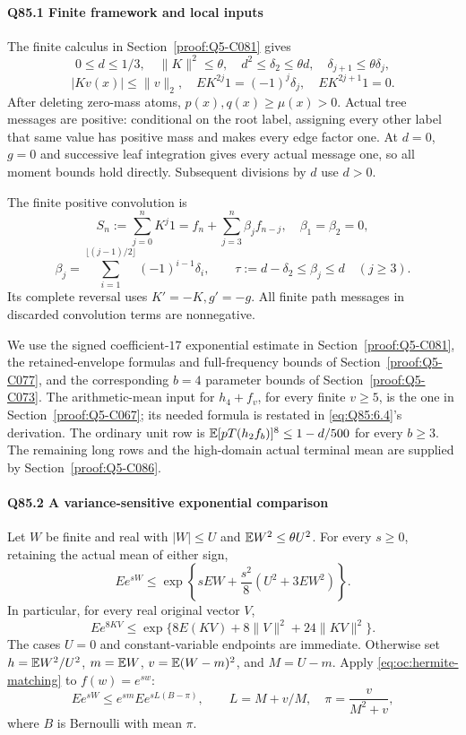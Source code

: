 \paragraph{Q85.1 Finite framework and local inputs}
The finite calculus in Section~\ref{proof:Q5-C081} gives
\[
 0\le d\le1/3,\quad\|K\|^2\le\theta,\quad
 d^2\le \delta_2\le\theta d,\quad \delta_{j+1}\le\theta \delta_j,
\]
\[
 |Kv(x)|\le\|v\|_2,\quad
 EK^{2j}1=(-1)^j \delta_j,\quad EK^{2j+1}1=0.               \tag{Q85.1.1}\label{eq:Q85:1.1}
\]
After deleting zero-mass atoms, \(p(x),\allowbreak q(x)\ge\allowbreak \mu(x)>\allowbreak 0\).
Actual tree messages are positive: conditional on the root label, assigning every other label that same value has positive mass and makes every edge factor one.
At \(d=\allowbreak 0\), \(g=\allowbreak 0\) and successive leaf integration gives every actual message one, so all moment bounds hold directly.
Subsequent divisions by \(d\) use \(d>\allowbreak 0\).

The finite positive convolution is
\[
 S_n:=\sum_{j=0}^nK^j1
 =f_n+\sum_{j=3}^n\beta_jf_{n-j},\quad
 \beta_1=\beta_2=0,
\]
\[
 \beta_j=\sum_{i=1}^{\lfloor(j-1)/2\rfloor}(-1)^{i-1}\delta_i,
 \qquad \tau:=d-\delta_2\le\beta_j\le d\quad(j\ge3).        \tag{Q85.1.2}\label{eq:Q85:1.2}
\]
Its complete reversal uses \(K'=\allowbreak -K,\allowbreak g'=\allowbreak -g\).
All finite path messages in discarded convolution terms are nonnegative.

We use the signed coefficient-\(17\) exponential estimate in Section~\ref{proof:Q5-C081}, the retained-envelope formulas and full-frequency bounds of Section~\ref{proof:Q5-C077}, and the corresponding \(b=\allowbreak 4\) parameter bounds of Section~\ref{proof:Q5-C073}.
The arithmetic-mean input for \(h_4+f_v\), for every finite \(v\ge\allowbreak 5\), is the one in Section~\ref{proof:Q5-C067}; its needed formula is restated in \eqref{eq:Q85:6.4}'s derivation.
The ordinary unit row is \( \mathbb E[pT(h_2f_b)]^8\le\allowbreak 1-d/500\) for every \(b\ge\allowbreak 3\).
The remaining long rows and the high-domain actual terminal mean are supplied by Section~\ref{proof:Q5-C086}.

\paragraph{Q85.2 A variance-sensitive exponential comparison}\label{calc:Q85:variance-exp}
Let \(W\) be finite and real with \(|W|\le\allowbreak  U\) and
\(\mathbb E W^2\le\allowbreak \theta U^2\). For every \(s\ge\allowbreak 0\), retaining the actual mean of either sign,
\[
 E e^{sW}\le
 \exp\left\{sEW+\frac{s^2}{8}(U^2+3EW^2)\right\}.    \tag{Q85.2.1}\label{eq:Q85:2.1}
\]
In particular, for every real original vector \(V\),
\[
 E e^{8KV}\le
 \exp\{8E(KV)+8\|V\|^2+24\|KV\|^2\}.                \tag{Q85.2.2}\label{eq:Q85:2.2}
\]
The cases \(U=0\) and constant-variable endpoints are immediate.
Otherwise set \(h=\mathbb E W^2/U^2\), \(m=\mathbb E W\),
\(v=\mathbb E(W-m)^2\), and \(M=U-m\).
Apply \eqref{eq:oc:hermite-matching} to \(f(w)=e^{sw}\):
\[
 E e^{sW}\le e^{sm}E e^{sL(B-\pi)},\qquad
 L=M+v/M,\quad \pi=\frac{v}{M^2+v},                   \tag{Q85.2.3}\label{eq:Q85:2.3}
\]
where \(B\) is Bernoulli with mean \(\pi\).

